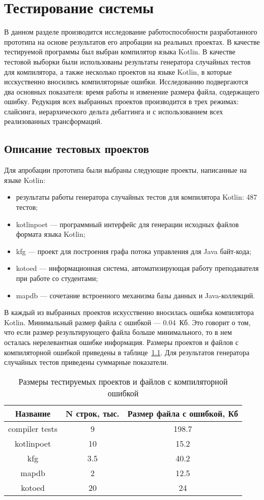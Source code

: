 \chapter{Тестирование системы}
В данном разделе производится исследование работоспособности разработанного прототипа на основе результатов его апробации на реальных проектах. В качестве тестируемой программы был выбран компилятор языка Kotlin. В качестве тестовой выборки были использованы результаты генератора случайных тестов для компилятора, а также несколько проектов на языке Kotlin, в которые исскуственно вносились компиляторные ошибки. Исследованию подвергаются два основных показателя: время работы и изменение размера файла, содержащего ошибку. Редукция всех выбранных проектов производится в трех режимах: слайсинга, иерархического дельта дебаггинга и с использованием всех реализованных трансформаций.
\section{Описание тестовых проектов}
Для апробации прототипа были выбраны следующие проекты, написанные на языке Kotlin:
\begin{itemize}
\item результаты работы генератора случайных тестов для компилятора Kotlin: 487 тестов;
\item kotlinpoet --- программный интерфейс для генерации исходных файлов формата языка Kotlin; 
\item kfg --- проект для построения графа потока управления для Java байт-кода;
\item kotoed --- информационная система, автоматизирующая работу преподавателя при работе со студентами;
\item mapdb --- сочетание встроенного механизма базы данных и Java-коллекций.
\end{itemize}
В каждый из выбранных проектов искусственно вносилась ошибка компилятора Kotlin. Минимальный размер файла с ошибкой --- 0.04~Кб. Это говорит о том, что если размер результирующего файла больше минимального, то в нем осталась нерелевантная ошибке информация. Размеры проектов и файлов с компиляторной ошибкой приведены в таблице~\ref{tab:size}. Для результатов генератора случайных тестов приведены суммарные показатели.
\begin{table}[]
\center
\caption{\label{tab:size}Размеры тестируемых проектов и файлов с компиляторной ошибкой}
\begin{tabular}{| c | c | c |}
\hline
\bf Название & \bf N строк, тыс. & \bf Размер файла с ошибкой, Кб \\
\hline
compiler tests & 9 & 198.7\\
\hline
kotlinpoet & 10 & 15.2\\
\hline
kfg & 3.5 & 40.2\\
\hline
mapdb & 2 & 12.5\\
\hline
kotoed & 20 & 24\\
\hline
\end{tabular}
\end{table}

